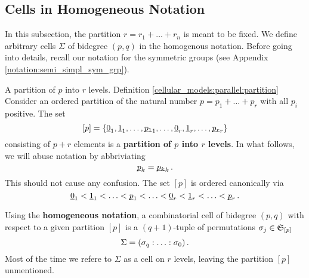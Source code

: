 \subsection{Cells in Homogeneous Notation}
\label{cellular_models:parallel:cells_in_homogenous_notation}
In this subsection, the partition $r = r_1 + \ldots + r_n$ is meant to be fixed.
We define arbitrary cells $\Sigma$ of bidegree $(p,q)$ in the homogenous notation.
Before going into details, recall our notation for the symmetric groups (see Appendix \ref{notation:semi_simpl_sym_grp}).

\begin{defi}
    \label{cellular_models:parallel:partition}
        {A partition of $p$ into $r$ levels.}
        {Definition \ref{cellular_models:parallel:partition}}
    Consider an ordered partition of the natural number $p = p_1+\ldots+p_r$ with all $p_i$ positive.
    The set
    \[
        [p] = \{ \ul 0_1, \ul 1_1, \ldots, \ul{p_1}_1, \ldots, \ul 0_r, \ul 1_r, \ldots, \ul{p_r}_r \}
    \]
    consisting of $p+r$ elements is a {\bf partition of $p$ into $r$ levels}.
    In what follows, we will abuse notation by abbriviating
    \[
        \underline{\smash{p}}_k = \underline{\smash{p_k}}_k \,.
    \]
    This should not cause any confusion.
    The set $[p]$ is ordered canonically via
    \[
        \ul0_1 < \ul1_1 < \ldots < \ul p_1 < \ldots < \ul 0_r < \ul 1_r < \ldots < \ul p_r \,.
    \]
\end{defi}

\begin{defi}
    \label{cellular_models:parallel:homogeneous_notation}
    Using the {\bf homogeneous notation}, a combinatorial cell of bidegree $(p,q)$ with respect to a given partition $[p]$ is a $(q+1)$-tuple of permutations $\sigma_j \in \mathfrak S_{[p]}$
    \[
        \Sigma = \homogq \,.
    \]
    Most of the time we refere to $\Sigma$ as a cell on $r$ levels, leaving the partition $[p]$ unmentioned.
\end{defi}

